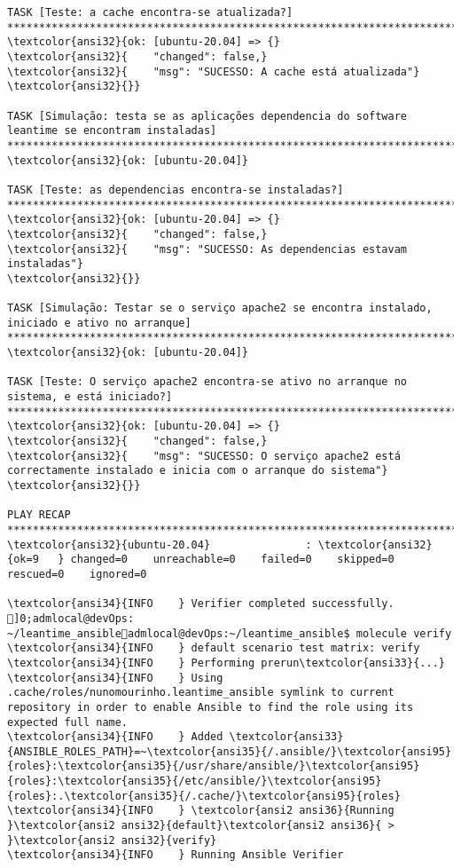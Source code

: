 \documentclass{scrartcl}
\begin{document}
\begin{Verbatim}
TASK [Teste: a cache encontra-se atualizada?] ***********************************************************************************************************************************************
\textcolor{ansi32}{ok: [ubuntu-20.04] => {}
\textcolor{ansi32}{    "changed": false,}
\textcolor{ansi32}{    "msg": "SUCESSO: A cache está atualizada"}
\textcolor{ansi32}{}}

TASK [Simulação: testa se as aplicações dependencia do software leantime se encontram instaladas] *******************************************************************************************
\textcolor{ansi32}{ok: [ubuntu-20.04]}

TASK [Teste: as dependencias encontra-se instaladas?] ***************************************************************************************************************************************
\textcolor{ansi32}{ok: [ubuntu-20.04] => {}
\textcolor{ansi32}{    "changed": false,}
\textcolor{ansi32}{    "msg": "SUCESSO: As dependencias estavam instaladas"}
\textcolor{ansi32}{}}

TASK [Simulação: Testar se o serviço apache2 se encontra instalado, iniciado e ativo no arranque] *******************************************************************************************
\textcolor{ansi32}{ok: [ubuntu-20.04]}

TASK [Teste: O serviço apache2 encontra-se ativo no arranque no sistema, e está iniciado?] **************************************************************************************************
\textcolor{ansi32}{ok: [ubuntu-20.04] => {}
\textcolor{ansi32}{    "changed": false,}
\textcolor{ansi32}{    "msg": "SUCESSO: O serviço apache2 está correctamente instalado e inicia com o arranque do sistema"}
\textcolor{ansi32}{}}

PLAY RECAP **********************************************************************************************************************************************************************************
\textcolor{ansi32}{ubuntu-20.04}               : \textcolor{ansi32}{ok=9   } changed=0    unreachable=0    failed=0    skipped=0    rescued=0    ignored=0

\textcolor{ansi34}{INFO    } Verifier completed successfully.
]0;admlocal@devOps: ~/leantime_ansibleadmlocal@devOps:~/leantime_ansible$ molecule verify
\textcolor{ansi34}{INFO    } default scenario test matrix: verify
\textcolor{ansi34}{INFO    } Performing prerun\textcolor{ansi33}{...}
\textcolor{ansi34}{INFO    } Using .cache/roles/nunomourinho.leantime_ansible symlink to current repository in order to enable Ansible to find the role using its expected full name.
\textcolor{ansi34}{INFO    } Added \textcolor{ansi33}{ANSIBLE_ROLES_PATH}=~\textcolor{ansi35}{/.ansible/}\textcolor{ansi95}{roles}:\textcolor{ansi35}{/usr/share/ansible/}\textcolor{ansi95}{roles}:\textcolor{ansi35}{/etc/ansible/}\textcolor{ansi95}{roles}:.\textcolor{ansi35}{/.cache/}\textcolor{ansi95}{roles}
\textcolor{ansi34}{INFO    } \textcolor{ansi2 ansi36}{Running }\textcolor{ansi2 ansi32}{default}\textcolor{ansi2 ansi36}{ > }\textcolor{ansi2 ansi32}{verify}
\textcolor{ansi34}{INFO    } Running Ansible Verifier


\end{Verbatim}
\end{document}
